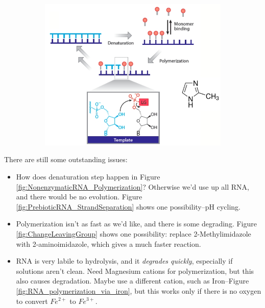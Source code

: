 \documentclass[]{article}
\begin{document}
\begin{figure}[H]
\begin{subfigure}[b]{0.45\textwidth}
		\includegraphics[width=\textwidth]{NonenzymaticRNA_Polymerization}
	\end{subfigure}
\end{figure}


There are still some outstanding issues:
\begin{itemize}
	\item How does denaturation step happen in Figure \ref{fig:NonenzymaticRNA_Polymerization}? Otherwise we'd use up all RNA, and there would be no evolution. Figure \ref{fig:PrebioticRNA_StrandSeparation} shows one possibility--pH cycling.
	\item Polymerization isn't as fast as we'd like, and there is some degrading. Figure \ref{fig:ChangeLeavingGroup} shows one possibility: replace 2-Methylimidazole with 2-aminoimidazole\cite{li2017enhanced}, which gives a much faster reaction.
	\item  RNA is very labile to hydrolysis, and it \textit{degrades quickly}, especially if solutions aren't clean. Need Magnesium cations for polymerization, but this also causes degradation. Maybe use a different cation, such as Iron--Figure \ref{fig:RNA_polymerization_via_iron}\cite{blain2014progress}, but this works only if there is no oxygen to convert $Fe^{2+}$ to $Fe^{3+}$.
\end{itemize}
\end{document}
